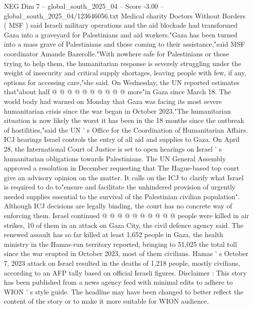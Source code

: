 \begin{textsample}{NEG Dim 7 – global\_south\_2025\_04 – Score -3.00 – global\_south\_2025\_04/123646056.txt}
Medical charity Doctors Without Borders ( MSF ) said Israeli military operations and the aid blockade had transformed Gaza into a graveyard for Palestinians and aid workers."Gaza has been turned into a mass grave of Palestinians and those coming to their assistance,"said MSF coordinator Amande Bazerolle."With nowhere safe for Palestinians or those trying to help them, the humanitarian response is severely struggling under the weight of insecurity and critical supply shortages, leaving people with few, if any, options for accessing care,"she said.
On Wednesday, the UN reported estimates that"about half @ @ @ @ @ @ @ @ @ @ more"in Gaza since March 18.
The world body had warned on Monday that Gaza was facing its most severe humanitarian crisis since the war began in October 2023."The humanitarian situation is now likely the worst it has been in the 18 months since the outbreak of hostilities,"said the UN ' s Office for the Coordination of Humanitarian Affairs.
ICJ hearings Israel controls the entry of all aid and supplies to Gaza.
On April 28, the International Court of Justice is set to open hearings on Israel ' s humanitarian obligations towards Palestinians.
The UN General Assembly approved a resolution in December requesting that The Hague-based top court give an advisory opinion on the matter.
It calls on the ICJ to clarify what Israel is required to do to"ensure and facilitate the unhindered provision of urgently needed supplies essential to the survival of the Palestinian civilian population".
Although ICJ decisions are legally binding, the court has no concrete way of enforcing them.
Israel continued @ @ @ @ @ @ @ @ @ @ people were killed in air strikes, 10 of them in an attack on Gaza City, the civil defence agency said.
The renewed assault has so far killed at least 1,652 people in Gaza, the health ministry in the Hamas-run territory reported, bringing to 51,025 the total toll since the war erupted in October 2023, most of them civilians.
Hamas ' s October 7, 2023 attack on Israel resulted in the deaths of 1,218 people, mostly civilians, according to an AFP tally based on official Israeli figures.
Disclaimer : This story has been published from a news agency feed with minimal edits to adhere to WION ' s style guide.
The headline may have been changed to better reflect the content of the story or to make it more suitable for WION audience.

\end{textsample}
